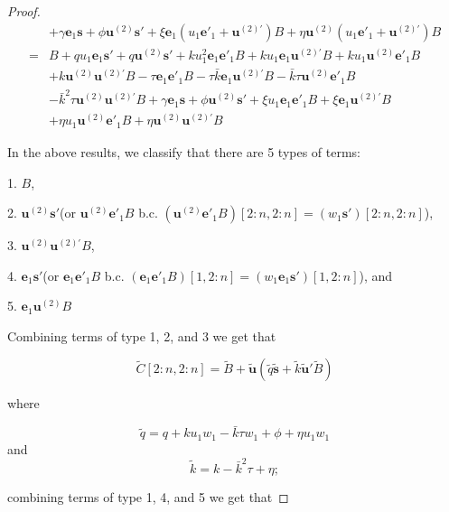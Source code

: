 \documentclass{article}
\begin{document}
\begin{proof}
\begin{equation}
\begin{aligned}
        &+\gamma \mathbf{e}_1\mathbf{s}+\phi \mathbf{u}^{(2)}\mathbf{s}'+\xi\mathbf{e}_1(u_1\mathbf{e'}_1+\mathbf{u}^{(2)'})B+\eta\mathbf{u}^{(2)}(u_1\mathbf{e'}_1+\mathbf{u}^{(2)'})B\\
        =&B+qu_1\mathbf{e}_1\mathbf{s}'+q\mathbf{u}^{(2)}\mathbf{s}'+ku_1^2\mathbf{e}_1\mathbf{e'}_1B+ku_1\mathbf{e}_1\mathbf{u}^{(2)'}B+ku_1\mathbf{u}^{(2)}\mathbf{e'}_1B\\
        &+k\mathbf{u}^{(2)}\mathbf{u}^{(2)'}B-\tau\mathbf{e}_1\mathbf{e'}_1B-\tau\bar{k}\mathbf{e}_1\mathbf{u}^{(2)'}B-\bar{k}\tau \mathbf{u}^{(2)}\mathbf{e'}_1B\\
        &-\bar{k}^2\tau\mathbf{u}^{(2)}\mathbf{u}^{(2)'}B+\gamma \mathbf{e}_1\mathbf{s}+\phi \mathbf{u}^{(2)}\mathbf{s}'+\xi u_1\mathbf{e}_1\mathbf{e'}_1B+\xi\mathbf{e}_1\mathbf{u}^{(2)'}B\\
        &+\eta u_1\mathbf{u}^{(2)}\mathbf{e'}_1B+\eta\mathbf{u}^{(2)}\mathbf{u}^{(2)'}B
    \end{aligned}
\end{equation}

In the above results, we classify that there are 5 types of terms:

1. $B$, 

2. $\mathbf{u}^{(2)}\mathbf{s}'$(or $\mathbf{u}^{(2)}\mathbf{e'}_1B$ b.c. $(\mathbf{u}^{(2)}\mathbf{e'}_1B)[2:n, 2:n]=(w_1\mathbf{s}')[2:n, 2:n]$), 

3. $\mathbf{u}^{(2)}\mathbf{u}^{(2)'}B$, 

4. $\mathbf{e}_1\mathbf{s}'$(or $\mathbf{e}_1\mathbf{e'}_1B$ b.c. $(\mathbf{e}_1\mathbf{e'}_1B)[1,2:n]=(w_1\mathbf{e}_1\mathbf{s}')[1,2:n]$), and 

5. $\mathbf{e}_1\mathbf{u}^{(2)}B$

Combining terms of type 1, 2, and 3 we get that

\begin{equation}
\tilde{C}[2:n,2:n]=\tilde{B}+\tilde{\mathbf{u}}(\tilde{q}\tilde{\mathbf{s}}+\tilde{k}\tilde{\mathbf{u}}'\tilde{B})
\end{equation}

where

\begin{equation}
 \tilde{q}=q+ku_1w_1-\bar{k}\tau w_1+\phi+\eta u_1w_1
\end{equation}
and
\begin{equation}
    \tilde{k}=k-\bar{k}^2\tau+\eta;
\end{equation}

combining terms of type 1, 4, and 5 we get that 


\end{proof}
\end{document}
